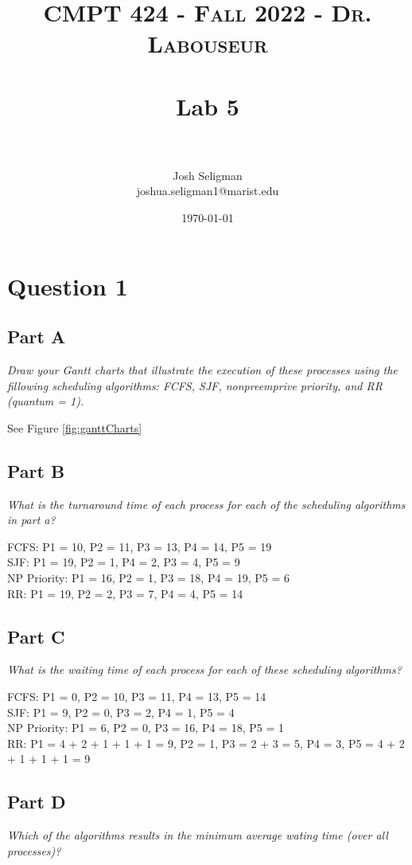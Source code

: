 \documentclass[letterpaper, 10pt,DIV=13]{scrartcl}
\title{	
   \normalfont \normalsize 
   \textsc{CMPT 424 - Fall 2022 - Dr. Labouseur} \\[10pt] %
   \horrule{0.5pt} \\[0.25cm] 	%
   \huge Lab 5  \\     	    %
   \horrule{0.5pt} \\[0.25cm] 	%
}
\author{Josh Seligman \\ \normalsize joshua.seligman1@marist.edu}
\date{\normalsize\today} 	%
\numberwithin{equation}{section} %
\numberwithin{figure}{section} %
\numberwithin{table}{section} %
\begin{document}
\maketitle %

\section{Question 1}
\subsection{Part A}
\textit{Draw your Gantt charts that illustrate the execution of these processes using the fillowing scheduling algorithms: FCFS, SJF, nonpreemprive priority, and RR (quantum = 1).}

See Figure \ref{fig:ganttCharts}

\subsection{Part B}
\textit{What is the turnaround time of each process for each of the scheduling algorithms in part a?}

FCFS: P1 = 10, P2 = 11, P3 = 13, P4 = 14, P5 = 19 \\
SJF: P1 = 19, P2 = 1, P4 = 2, P3 = 4, P5 = 9 \\
NP Priority: P1 = 16, P2 = 1, P3 = 18, P4 = 19, P5 = 6 \\
RR: P1 = 19, P2 = 2, P3 = 7, P4 = 4, P5 = 14


\subsection{Part C}
\textit{What is the waiting time of each process for each of these scheduling algorithms?}

FCFS: P1 = 0, P2 = 10, P3 = 11, P4 = 13, P5 = 14 \\
SJF: P1 = 9, P2 = 0, P3 = 2, P4 = 1, P5 = 4 \\
NP Priority: P1 = 6, P2 = 0, P3 = 16, P4 = 18, P5 = 1 \\
RR: P1 = 4 + 2 + 1 + 1 + 1 = 9, P2 = 1, P3 = 2 + 3 = 5, P4 = 3, P5 = 4 + 2 + 1 + 1 + 1 = 9


\subsection{Part D}
\textit{Which of the algorithms results in the minimum average wating time (over all processes)?}
\end{document}
